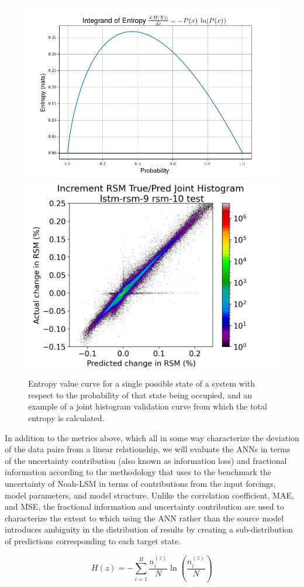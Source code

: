 \begin{figure}[h!]
    \centering
    \includegraphics[width=.54\linewidth,draft=false]{figures/entropy.png}
    \includegraphics[width=.44\linewidth,draft=false]{figures/validation-curves/eval_test_lstm-rsm-9_rsm-10_hist-true-pred_na.png}

    \caption{Entropy value curve for a single possible state of a system with respect to the probability of that state being occupied, and an example of a joint histogram validation curve from which the total entropy is calculated.}
    \label{entropy}
\end{figure}

In addition to the metrics above, which all in some way characterize the deviation of the data pairs from a linear relationship, we will evaluate the ANNs in terms of the uncertainty contribution (also known as information loss) and fractional information according to the methodology that \citep{nearing_benchmarking_2016} uses to the benchmark the uncertainty of Noah-LSM in terms of contributions from the input forcings, model parameters, and model structure. Unlike the correlation coefficient, MAE, and MSE, the fractional information and uncertainty contribution are used to characterize the extent to which using the ANN rather than the source model introduces ambiguity in the distribution of results by creating a sub-distribution of predictions corresponding to each target state.

\begin{equation}\label{eq-entropy-h}
    H(z) = - \sum_{i=1}^B \frac{n^{(z)}_i}{N}\ln\left(\frac{n^{(z)}_i}{N}\right) %
\end{equation}

